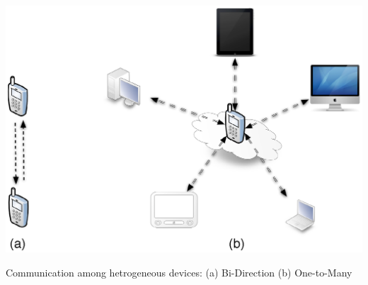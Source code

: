 \begin{center-figure}
	\includegraphics[scale=0.8]{fig/NetworkCommunication_Star.eps}
	\caption{Communication among hetrogeneous devices: (a) Bi-Direction (b) One-to-Many}
	\label{fig:StarCommunication}
\end{center-figure}
%
%

%
%




